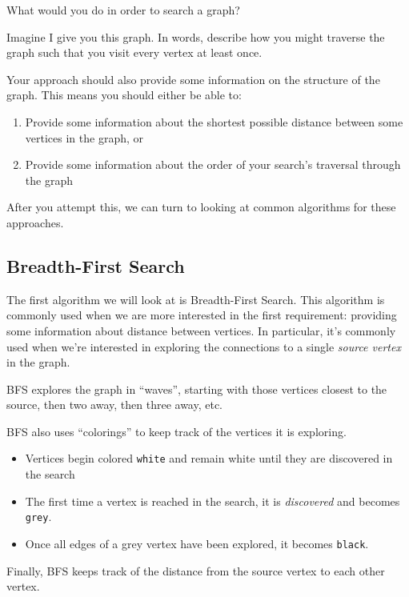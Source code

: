 \documentclass[12pt]{article}
\begin{document}
What would you do in order to search a graph? 

Imagine I give you this graph. In words, describe how you might traverse the graph such that you visit every vertex at least once.

Your approach should also provide some information on the structure of the graph. This means you should either be able to:

\begin{enumerate}
    \item Provide some information about the shortest possible distance between some vertices in the graph, or
    \item Provide some information about the order of your search's traversal through the graph
\end{enumerate}

After you attempt this, we can turn to looking at common algorithms for these approaches.

\subsection*{Breadth-First Search}

The first algorithm we will look at is Breadth-First Search. This algorithm is commonly used when we are more interested in the first requirement: providing some information about distance between vertices. In particular, it's commonly used when we're interested in exploring the connections to a single \textit{source vertex} in the graph.

BFS explores the graph in ``waves'', starting with those vertices closest to the source, then two away, then three away, etc. 

BFS also uses ``colorings'' to keep track of the vertices it is exploring.

\begin{itemize}
    \item Vertices begin colored \texttt{white} and remain white until they are discovered in the search
    \item The first time a vertex is reached in the search, it is \textit{discovered} and becomes \texttt{grey}.
    \item Once all edges of a grey vertex have been explored, it becomes \texttt{black}.
\end{itemize}

Finally, BFS keeps track of the distance from the source vertex to each other vertex. 
\end{document}

